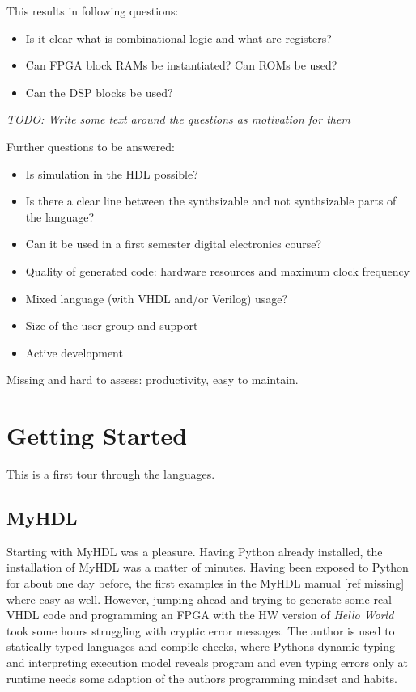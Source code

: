 \documentclass[10pt, conference, compsocconf]{IEEEtran}
\newcommand{\todo}[1]{{\emph{TODO: #1}}}
\begin{document}
This results in following questions:
\begin{itemize}
\item Is it clear what is combinational logic and what are registers?
\item Can FPGA block RAMs be instantiated? Can ROMs be used?
\item Can the DSP blocks be used?
\end{itemize}

\todo{Write some text around the questions as motivation for them}

Further questions to be answered:

\begin{itemize}
\item Is simulation in the HDL possible?
\item Is there a clear line between the synthsizable  and not synthsizable parts of the language?
\item Can it be used in a first semester digital electronics course?
\item Quality of generated code: hardware resources and maximum clock frequency
\item Mixed language (with VHDL and/or Verilog) usage?
\item Size of the user group and support
\item Active development
\end{itemize}

Missing and hard to assess: productivity, easy to maintain.

\section{Getting Started}

This is a first tour through the languages.

\subsection{MyHDL}

Starting with MyHDL was a pleasure. Having Python already installed, the installation
of MyHDL was a matter of minutes. Having been exposed to Python for about one
day before, the first examples in the MyHDL manual [ref missing] where easy as well.
However, jumping ahead and trying to generate some real VHDL code and programming
an FPGA with the HW version of \emph{Hello World} took some hours struggling
with cryptic error messages. The author is used to statically typed languages and
compile checks, where Pythons dynamic typing and interpreting execution model
reveals program and even typing errors only at runtime needs some adaption of
the authors programming mindset and habits.
\end{document}
